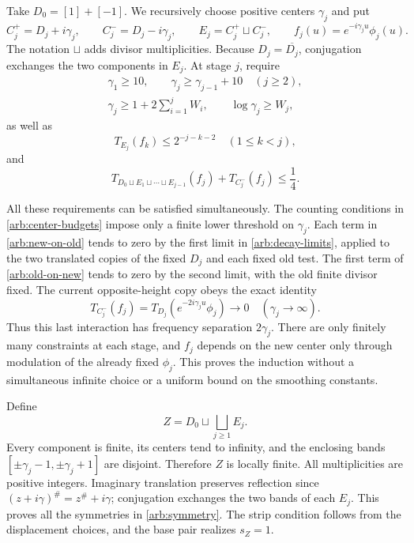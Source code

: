 Take \(D_0=[1]+[-1]\). We recursively choose positive centers
\(\gamma_j\) and put
\begin{equation}\label{arb:symmetric-components}
 C_j^+=D_j+i\gamma_j,\qquad
 C_j^-=D_j-i\gamma_j,\qquad
 E_j=C_j^+\sqcup C_j^-,\qquad
 f_j(u)=e^{-i\gamma_j u}\phi_j(u).
\end{equation}
The notation \(\sqcup\) adds divisor multiplicities. Because
\(D_j=\overline{D_j}\), conjugation exchanges the two
components in \(E_j\). At stage \(j\), require
\begin{equation}\label{arb:center-budgets}
 \begin{gathered}
 \gamma_1\ge10,\qquad
 \gamma_j\ge\gamma_{j-1}+10\quad(j\ge2),\\
 \gamma_j\ge1+2\sum_{i=1}^jW_i,\qquad
 \log\gamma_j\ge W_j,
 \end{gathered}
\end{equation}
as well as
\begin{equation}\label{arb:new-on-old}
 T_{E_j}(f_k)\le2^{-j-k-2}\quad(1\le k<j),
\end{equation}
and
\begin{equation}\label{arb:old-on-new}
 T_{D_0\sqcup E_1\sqcup\cdots\sqcup E_{j-1}}(f_j)
                   +T_{C_j^-}(f_j)\le\frac14.
\end{equation}

All these requirements can be satisfied simultaneously.
The counting conditions in \eqref{arb:center-budgets} impose
only a finite lower threshold on \(\gamma_j\). Each term in
\eqref{arb:new-on-old} tends to zero by the first limit in
\eqref{arb:decay-limits}, applied to the two translated copies
of the fixed \(D_j\) and each fixed old test. The first term
of \eqref{arb:old-on-new} tends to zero by the second limit,
with the old finite divisor fixed. The current opposite-height
copy obeys the exact identity
\begin{equation}\label{arb:opposite-height}
 T_{C_j^-}(f_j)
     =T_{D_j}(e^{-2i\gamma_j u}\phi_j)
                   \longrightarrow0\quad(\gamma_j\to\infty).
\end{equation}
Thus this last interaction has frequency separation
\(2\gamma_j\). There are only finitely many constraints at
each stage, and \(f_j\) depends on the new center only through
modulation of the already fixed \(\phi_j\). This proves the
induction without a simultaneous infinite choice or a uniform
bound on the smoothing constants.

Define
\begin{equation}\label{arb:divisor}
 Z=D_0\sqcup\bigsqcup_{j\ge1}E_j.
\end{equation}
Every component is finite, its centers tend to infinity, and
the enclosing bands \([\pm\gamma_j-1,\pm\gamma_j+1]\)
are disjoint. Therefore \(Z\) is locally finite. All
multiplicities are positive integers. Imaginary translation
preserves reflection since
\((z+i\gamma)^\#=z^\#+i\gamma\); conjugation exchanges
the two bands of each \(E_j\). This proves all the
symmetries in \eqref{arb:symmetry}. The strip condition follows
from the displacement choices, and the base pair realizes
\(s_Z=1\).


